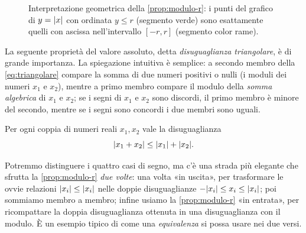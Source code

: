 \begin{figure}[htb]
\centering
{}
\caption{Interpretazione geometrica della \cref{prop:modulo-r}: i punti del grafico di
$y=\lvert x\rvert$ con ordinata $y\le r$ (segmento verde) sono esattamente quelli con ascissa
nell'intervallo $[-r,r]$ (segmento color rame).}
\label{fig:modulo-r}
\end{figure}

La seguente proprietà del valore assoluto, detta \emph{disuguaglianza triangolare}, è
di grande importanza. La spiegazione intuitiva è semplice: a secondo membro della
\eqref{eq:triangolare} compare la somma di due numeri positivi o nulli (i moduli dei
numeri $x_{1}$ e $x_{2}$), mentre a primo membro compare il modulo della \emph{somma
algebrica} di $x_{1}$ e $x_{2}$; se i segni di $x_{1}$ e $x_{2}$ sono discordi, il
primo membro è minore del secondo, mentre se i segni sono concordi i due membri sono
uguali.

\begin{teorema}\label{teo:triangolare}
Per ogni coppia di numeri reali $x_{1},x_{2}$ vale la disuguaglianza
\begin{equation}\label{eq:triangolare}
  \lvert x_{1}+x_{2}\rvert\le\lvert x_{1}\rvert+\lvert x_{2}\rvert.
\end{equation}
\end{teorema}

\begin{schema}
\end{schema}

\begin{strategia}
Potremmo distinguere i quattro casi di segno, ma c'è una strada più elegante che
sfrutta la \cref{prop:modulo-r} \emph{due volte}: una volta «in uscita», per
trasformare le ovvie relazioni $\lvert x_{i}\rvert\le\lvert x_{i}\rvert$ nelle doppie disuguaglianze
$-\lvert x_{i}\rvert\le x_{i}\le\lvert x_{i}\rvert$; poi sommiamo membro a membro; infine usiamo la
\cref{prop:modulo-r} «in entrata», per ricompattare la doppia disuguaglianza ottenuta
in una disuguaglianza con il modulo. È un esempio tipico di come una
\emph{equivalenza} si possa usare nei due versi.
\end{strategia}

